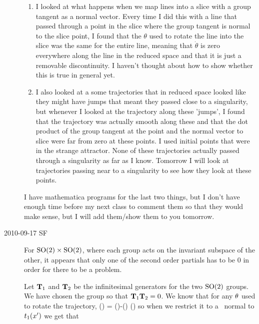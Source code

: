 \begin{description}
\begin{enumerate}
\item
I looked at what happens when we map lines into a slice with a group tangent as a normal vector. Every time I did this with a line that passed through a point in the slice where the group tangent is normal to the slice point, I found that the $\theta$ used to rotate the line into the slice was the same for the entire line, meaning that $\dot \theta$ is zero everywhere along the line in the reduced space and that it is just a removable discontinuity. I haven't thought about how to show whether this is true in general yet.

\item
I also looked at a some trajectories that in reduced space looked like they might have jumps that meant they passed close to a singularity, but whenever I looked at the trajectory along these 'jumps', I found that the trajectory was actually smooth along these and that the dot product of the group tangent at the point and the normal vector to slice were far from zero at these points. I used initial points that were in the strange attractor. None of these trajectories actually passed through a singularity as far as I know. Tomorrow I will look at trajectories passing near to a singularity to see how they look at these points.

\end{enumerate}

I have mathematica programs for the last two things, but I don't have enough time before my next class to comment them so that they would make sense, but I will add them/show them to you tomorrow.

\item[2010-09-17 SF]
For $\textrm{SO}(2) \times \textrm{SO}(2)$, where each group acts on the invariant subspace of the other, it appears that only one of the second order partials has to be 0 in order for there to be a problem.

Let $\mathbf{T}_1$ and $\mathbf{T}_2$ be the infinitesimal generators for the two $\textrm{SO}(2)$ groups. We have chosen the group so that $\mathbf{T}_1 \mathbf{T}_2=0$.
We know that for any ${\bf \theta}$ used to rotate the trajectory,
\beq
\velRed(\sspRed) = \vel(\sspRed)-\dot{\gSpace}(\sspRed) \cdot \groupTan(\sspRed)
\eeq
so when we restrict it to a \slice\ normal to $t_1(x')$ we get that


\end{description}
